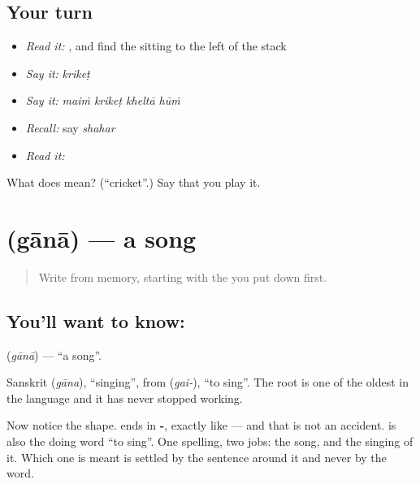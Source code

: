 \subsection*{Your turn}
\begin{itemize}
\raggedright
  \item \emph{Read it:} , and find the  sitting to the left of the stack
  \item \emph{Say it:} \emph{krikeṭ}
  \item \emph{Say it:} \emph{maiṁ krikeṭ kheltā hūṁ}
  \item \emph{Recall:} say \emph{shahar}
  \item \emph{Read it:} \textbf{}
\end{itemize}

\begin{tcolorbox}[breakable,colback=teal!4,colframe=teal!35!black,title={Before you move on}]
What does  mean? (\textquotedblleft{}cricket\textquotedblright{}.) Say that you play it.
\end{tcolorbox}
\section[\texorpdfstring{\hi{गाना} (gānā)}{गाना (gānā)}]{ (gānā) — a song}

\label{lesson:HI-C70-song}



\begin{quote}
Write \textbf{} from memory, starting with the  you put down first.
\end{quote}

\subsection*{You'll want to know: }
\textbf{} (\emph{gānā}) — \textquotedblleft{}a song\textquotedblright{}.

Sanskrit  (\emph{gāna}), \textquotedblleft{}singing\textquotedblright{}, from  (\emph{gai-}), \textquotedblleft{}to sing\textquotedblright{}. The root is one of the oldest in the language and it has never stopped working.

Now notice the shape.  ends in \textbf{-}, exactly like  — and that is not an accident.  is also the doing word \textquotedblleft{}to sing\textquotedblright{}. One spelling, two jobs: the song, and the singing of it. Which one is meant is settled by the sentence around it and never by the word.

